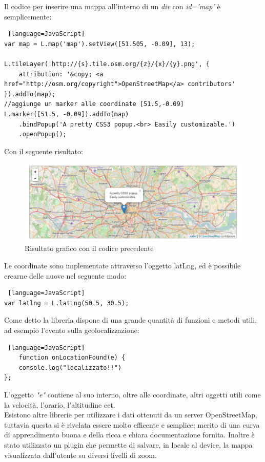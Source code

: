 Il codice per inserire una mappa all'interno di un \textit{div} con \textit{id='map'} è semplicemente:
\begin{lstlisting} [language=JavaScript]
var map = L.map('map').setView([51.505, -0.09], 13);

L.tileLayer('http://{s}.tile.osm.org/{z}/{x}/{y}.png', {
    attribution: '&copy; <a href="http://osm.org/copyright">OpenStreetMap</a> contributors'
}).addTo(map);
//aggiunge un marker alle coordinate [51.5,-0.09]
L.marker([51.5, -0.09]).addTo(map)
    .bindPopup('A pretty CSS3 popup.<br> Easily customizable.')
    .openPopup();
\end{lstlisting}
Con il seguente risultato:
\begin{figure}[H]
	\centering
	\includegraphics[scale=0.4]{Implementazione/leaflet_result.png}
	\caption{Risultato grafico con il codice precedente}
	\label{fig:leaflet_result}
\end{figure}
Le coordinate sono implementate attraverso l'oggetto latLng, ed è possibile crearne delle nuove nel seguente modo:
\begin{lstlisting} [language=JavaScript]
var latlng = L.latLng(50.5, 30.5);
\end{lstlisting}
Come detto la libreria dispone di una grande quantità di funzioni e metodi utili, ad esempio l'evento sulla geolocalizzazione:
\begin{lstlisting} [language=JavaScript]
	function onLocationFound(e) {
	console.log("localizzato!!")
};
\end{lstlisting}
L'oggetto \textit{"e"} contiene al suo interno, oltre alle coordinate, altri oggetti utili come la velocità, l'orario, l'altitudine ect.\\
Esistono altre librerie per utilizzare i dati ottenuti da un server OpenStreetMap, tuttavia questa si è rivelata essere molto efficente e semplice; merito di una curva di apprendimento buona e della ricca e chiara documentazione fornita. Inoltre è stato utilizzato un plugin che permette di salvare, in locale al device, la mappa visualizzata dall'utente su diversi livelli di zoom.

